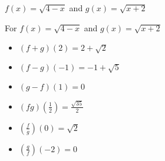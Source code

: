 {$f(x) = \sqrt{4-x}$ and $g(x) = \sqrt{x+2}$}
{For $f(x) = \sqrt{4-x}$ and $g(x) = \sqrt{x+2}$

\begin{multicols}{2}
\begin{itemize}
\item  $(f+g)(2) = 2+\sqrt{2}$
\item  $(f-g)(-1) = -1+\sqrt{5}$
\item  $(g-f)(1) = 0$
\item  $(fg)\left(\frac{1}{2}\right) = \frac{\sqrt{35}}{2}$
\item  $\left(\frac{f}{g}\right)(0) = \sqrt{2}$
\item  $\left(\frac{g}{f}\right)\left(-2\right) = 0$
\end{itemize}
\end{multicols}
}